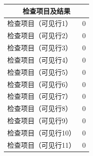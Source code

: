\documentclass[UTF8,10pt,a4paper,fontset=fandol]{ctexart}
\newcommand{\fieldvalue}[1]{#1}
\newcommand{\handwritten}[1]{#1}
\begin{document}
\begin{tabularx}{\textwidth}{|X|p{}|}
\hline
\multicolumn{2}{|c|}{\textbf{检查项目及结果}} \\ \hline

检查项目（可见行1） &
\fieldvalue{\handwritten{0}} \\ \hline

检查项目（可见行2） &
\fieldvalue{\handwritten{0}} \\ \hline

检查项目（可见行3） &
\fieldvalue{\handwritten{0}} \\ \hline

检查项目（可见行4） &
\fieldvalue{\handwritten{0}} \\ \hline

检查项目（可见行5） &
\fieldvalue{\handwritten{0}} \\ \hline

检查项目（可见行6） &
\fieldvalue{\handwritten{0}} \\ \hline

检查项目（可见行7） &
\fieldvalue{\handwritten{0}} \\ \hline

检查项目（可见行8） &
\fieldvalue{\handwritten{0}} \\ \hline

检查项目（可见行9） &
\fieldvalue{\handwritten{0}} \\ \hline

检查项目（可见行10） &
\fieldvalue{\handwritten{0}} \\ \hline

检查项目（可见行11） &
\fieldvalue{\handwritten{0}} \\ \hline


\end{tabularx}
\end{document}
